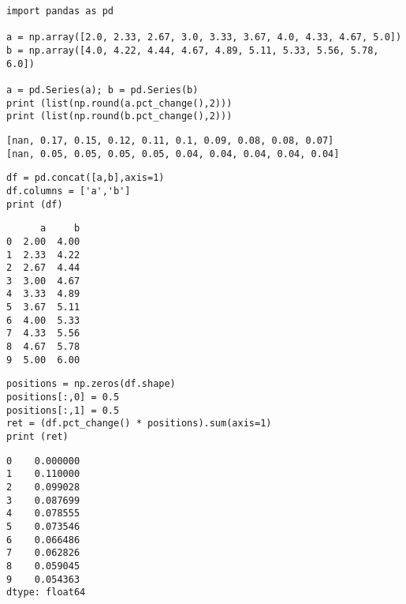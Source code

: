 \documentclass[12pt,fleqn]{article}\usepackage{../../common}
\begin{document}
\begin{verbatim}
import pandas as pd

a = np.array([2.0, 2.33, 2.67, 3.0, 3.33, 3.67, 4.0, 4.33, 4.67, 5.0])
b = np.array([4.0, 4.22, 4.44, 4.67, 4.89, 5.11, 5.33, 5.56, 5.78, 6.0])

a = pd.Series(a); b = pd.Series(b)
print (list(np.round(a.pct_change(),2)))
print (list(np.round(b.pct_change(),2)))
\end{verbatim}

\begin{verbatim}
[nan, 0.17, 0.15, 0.12, 0.11, 0.1, 0.09, 0.08, 0.08, 0.07]
[nan, 0.05, 0.05, 0.05, 0.05, 0.04, 0.04, 0.04, 0.04, 0.04]
\end{verbatim}


\begin{verbatim}
df = pd.concat([a,b],axis=1)
df.columns = ['a','b']
print (df)
\end{verbatim}

\begin{verbatim}
      a     b
0  2.00  4.00
1  2.33  4.22
2  2.67  4.44
3  3.00  4.67
4  3.33  4.89
5  3.67  5.11
6  4.00  5.33
7  4.33  5.56
8  4.67  5.78
9  5.00  6.00
\end{verbatim}

\begin{verbatim}
positions = np.zeros(df.shape)
positions[:,0] = 0.5
positions[:,1] = 0.5
ret = (df.pct_change() * positions).sum(axis=1)
print (ret)
\end{verbatim}

\begin{verbatim}
0    0.000000
1    0.110000
2    0.099028
3    0.087699
4    0.078555
5    0.073546
6    0.066486
7    0.062826
8    0.059045
9    0.054363
dtype: float64
\end{verbatim}
\end{document}
